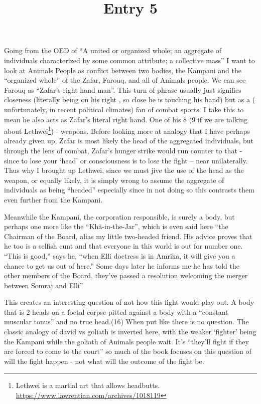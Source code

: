 \documentclass{article}
\title{Entry 5}
\begin{document}
\paragraph{}

Going from the OED of ``A united or organized whole; an aggregate of individuals characterized
by some common attribute; a collective mass'' I want to look at Animals People as conflict between two bodies, the Kampani and the ``organized whole'' of the Zafar, Farouq, and all of Animals people. 
We can see Farouq as ``Zafar’s right hand man''. This turn of phrase usually just signifies closeness (literally being on his right , so close he is touching his hand) but as a ( unfortunately, in recent political climates) fan of combat sports. I take this to mean he also acts as Zafar's literal right hand. One of his 8 (9 if we are talking about Lethwei\footnote{Lethwei is a martial art that allows headbutts. \url{https://www.lawrentian.com/archives/1018119}})  - weapons. Before looking more at analogy that I have perhaps already given up, Zafar is most likely the head of the aggregated individuals, but through the lens of combat, Zafar's hunger strike would run counter to that - since to lose your `head' or consciousness  is to lose the fight -- near unilaterally. Thus why I brought up Lethwei, since we must jive the use of the head as the weapon, or equally likely, it is simply wrong to assume the aggregate of individuals as being ``headed'' especially since in not doing so this contrasts them even further from the Kampani.

Meanwhile the Kampani, the corporation responsible, is surely a body, but perhaps one more like the ``Khã-in-the-Jar'', which is even said here ``the Chairman of the Board, alias my little two-headed friend. His advice proves that he too is a selfish cunt and that everyone in this world is out for number one. “This is good,” says he, “when Elli doctress is in Amrika, it will give you a chance to get us out of here.” Some days later he informs me he has told the other members of the Board, they’ve passed a resolution welcoming the merger between Somraj and Elli'' 

This creates an interesting question of not how this fight would play out. A body that is 2 heads on a foetal corpse pitted against a body with a ``constant muscular tonus'' and no true head.(16) When put like there is no question. The classic analogy of david vs goliath is inverted here, with the weaker `fighter' being the Kampani while the goliath of Animals people wait. It's ``they’ll fight if they are forced to come to the court'' so much of the book focuses on this question of will the fight happen - not what will the outcome of the fight be. 
\end{document}
